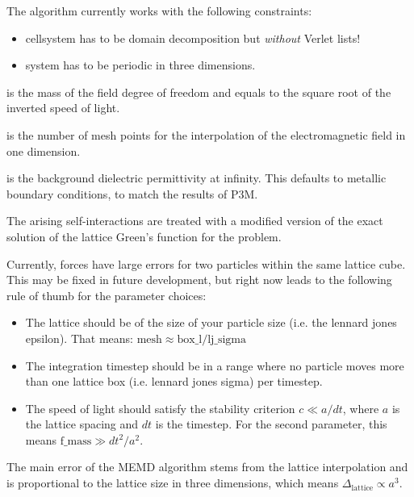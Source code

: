 The algorithm currently works with the following constraints:

\begin{itemize}
  \item cellsystem has to be domain decomposition but \emph{without}
    Verlet lists!
  \item system has to be periodic in three dimensions.
\end{itemize}

\begin{arguments}
\item[\var{f\_mass}] is the mass of the field degree of freedom and equals
  to the square root of the inverted speed of light.
\item[\var{mesh}] is the number of mesh points for the interpolation
  of the electromagnetic field in one dimension.
\item[\var{\varepsilon_{\infty}}] is the background dielectric
  permittivity at infinity. This defaults to metallic boundary
  conditions, to match the results of P3M.
\end{arguments}

The arising self-interactions are treated with a modified version of
the exact solution of the lattice Green's function for the
problem.

Currently, forces have large errors for two particles within the same
lattice cube. This may be fixed in future development, but right now
leads to the following rule of thumb for the parameter choices:

\begin{itemize}
  \item The lattice should be of the size of your particle size
    (i.e. the lennard jones epsilon). That means: $\text{mesh} \approx
    \text{box\_l} / \text{lj\_sigma}$
  \item The integration timestep should be in a range where no
    particle moves more than one lattice box (i.e. lennard jones
    sigma) per timestep.
  \item The speed of light should satisfy the stability criterion
    $c\ll a/dt$, where $a$ is the lattice spacing and $dt$ is the
    timestep. For the second parameter, this means $\text{f\_mass} \gg
    dt^2/a^2$.
\end{itemize}

The main error of the MEMD algorithm stems from the lattice
interpolation and is proportional to the lattice size in three
dimensions, which means $\Delta_\text{lattice} \propto a^3$.

